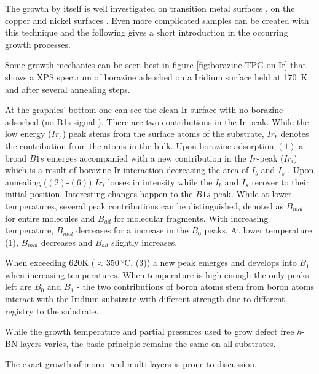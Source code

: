%

The growth by itself is well investigated on transition metal surfaces \cite{gomez_diaz_hexagonal_2013,morscher_formation_2006}, on the copper and nickel surfaces \cite{preobrajenski_monolayer_2005,joshi_boron_2012}. Even more complicated samples can be created with this technique \cite{roth_chemical_2013} and the following gives a short introduction in the occurring growth processes.

Some growth mechanics can be seen best in figure \ref{fig:borazine-TPG-on-Ir} that shows a XPS spectrum of borazine adsorbed on a Iridium surface held at \SI{170}{\kelvin} and after several annealing steps. 

At the graphics' bottom one can see the clean Ir surface with no borazine adsorbed (no B1s signal ). There are two contributions in the Ir-peak. While the low energy ($Ir_s$) peak stems from the surface atoms of the substrate, $Ir_b$ denotes the contribution from the atoms in the bulk. Upon borazine adsorption $(1)$ a broad $B1s$ emerges accompanied with a new contribution in the $Ir$-peak ($Ir_i$) which is a result of borazine-Ir interaction decreasing the area of $I_b$ and $I_s$ .
Upon annealing ($(2)$-$(6)$) $Ir_i$ looses in intensity while the $I_b$ and $I_s$ recover to their initial position. Interesting changes happen to the $B1s$ peak. While at lower temperatures, several peak contributions can be distinguished, denoted as $B_{mol}$ for entire molecules and $B_{ad}$ for molecular fragments. With increasing temperature, $B_{mol}$ decreases for a increase in the $B_0$ peaks. At lower temperature (1), $B_{mol}$ decreases and $B_{ad}$ slightly increases. 

When exceeding 620K ($\approx \SI{350}{\celsius}$, (3)) a new peak emerges and develops into $B_1$ when increasing temperatures. When temperature is high enough the only peaks left are $B_0$ and $B_1$ - the two contributions of boron atoms stem from boron atoms interact with the Iridium substrate with different strength due to different registry to the substrate.

While the growth temperature and partial pressures used to grow defect free \textit{h}-BN layers varies, the basic principle remains the same on all substrates.

The exact growth of mono- and multi layers \cite{ismach_toward_2012} is prone to discussion.

\FloatBarrier
